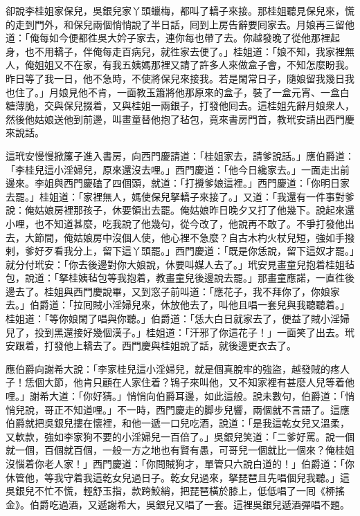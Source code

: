 卻說李桂姐家保兒，吳銀兒家丫頭蠟梅，都叫了轎子來接。那桂姐聽見保兒來，慌的走到門外，和保兒兩個悄悄說了半日話，囘到上房告辭要囘家去。月娘再三留他道：「俺每如今便都徃吳大妗子家去，連你每也帶了去。你越發晚了從他那裡起身，也不用轎子，伴俺每走百病兒，就徃家去便了。」桂姐道：「娘不知，我家裡無人，俺姐姐又不在家，有我五姨媽那裡又請了許多人來做盒子會，不知怎麼盼我。昨日等了我一日，他不急時，不使將保兒來接我。若是閑常日子，隨娘留我幾日我也住了。」月娘見他不肯，一面教玉簫將他那原來的盒子，裝了一盒元宵、一盒白糖薄脆，交與保兒掇着，又與桂姐一兩銀子，打發他囘去。這桂姐先辭月娘衆人，然後他姑娘送他到前邊，叫畫童替他抱了毡包，竟來書房門首，教玳安請出西門慶來說話。

這玳安慢慢掀簾子進入書房，向西門慶請道：「桂姐家去，請爹說話。」應伯爵道：「李桂兒這小淫婦兒，原來還沒去哩。」西門慶道：「他今日纔家去。」一面走出前邊來。李姐與西門慶磕了四個頭，就道：「打攪爹娘這裡。」西門慶道：「你明日家去罷。」桂姐道：「家裡無人，媽使保兒拏轎子來接了。」又道：「我還有一件事對爹說：俺姑娘房裡那孩子，休要領出去罷。俺姑娘昨日晚夕又打了他幾下。說起來還小哩，也不知道甚麼，吃我說了他幾句，從今改了，他說再不敢了。不爭打發他出去，大節間，俺姑娘房中沒個人使，他心裡不急麼？自古木杓火杖兒短，強如手撥剌，爹好歹看我分上，留下這丫頭罷。」西門慶道：「既是你恁說，留下這奴才罷。」就分付玳安：「你去後邊對你大娘說，休要叫媒人去了。」玳安見畫童兒抱着桂姐毡包，說道：「拏桂姨毡包等我抱着，教畫童兒後邊說去罷。」那畫童應諾，一直徃後邊去了。桂姐與西門慶說畢，又到窓子前叫道：「應花子，我不拜你了，你娘家去。」伯爵道：「拉囘賊小淫婦兒來，休放他去了，叫他且唱一套兒與我聽聽着。」桂姐道：「等你娘閑了唱與你聽。」伯爵道：「恁大白日就家去了，便益了賊小淫婦兒了，投到黑還接好幾個漢子。」桂姐道：「汗邪了你這花子！」一面笑了出去。玳安跟着，打發他上轎去了。西門慶與桂姐說了話，就後邊更衣去了。

應伯爵向謝希大說：「李家桂兒這小淫婦兒，就是個真脫牢的強盜，越發賊的疼人子！恁個大節，他肯只顧在人家住着？鴇子來叫他，又不知家裡有甚麼人兒等着他哩。」謝希大道：「你好猜。」悄悄向伯爵耳邊，如此這般。說未數句，伯爵道：「悄悄兒說，哥正不知道哩。」{}不一時，西門慶走的脚步兒響，兩個就不言語了。這應伯爵就把吳銀兒摟在懷裡，和他一遞一口兒吃酒，說道：「是我這乾女兒又溫柔，又軟款，強如李家狗不要的小淫婦兒一百倍了。」吳銀兒笑道：「二爹好罵。說一個就一個，百個就百個，一般一方之地也有賢有愚，可哥兒一個就比一個來？俺桂姐沒惱着你老人家！」西門慶道：「你問賊狗才，單管只六說白道的！」伯爵道：「你休管他，等我守着我這乾女兒過日子。乾女兒過來，拏琵琶且先唱個兒我聽。」這吳銀兒不忙不慌，輕舒玉指，款跨鮫綃，把琵琶橫於膝上，低低唱了一囘《桺搖金》。伯爵吃過酒，又遞謝希大，吳銀兒又唱了一套。這裡吳銀兒遞酒彈唱不題。

